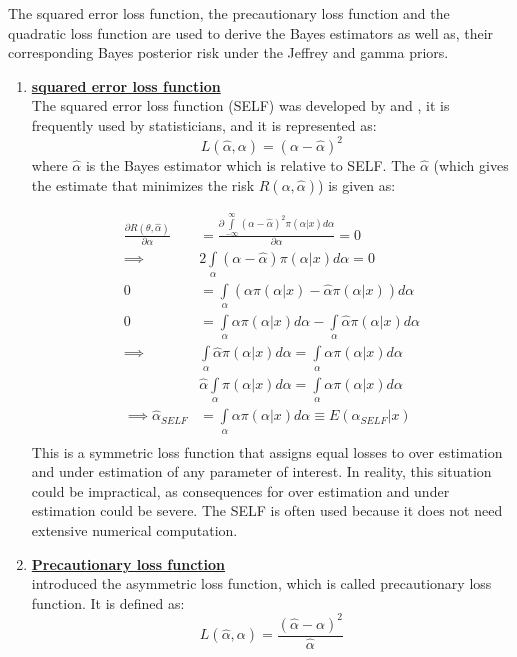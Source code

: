 \documentclass[a4paper,12pt]{report}
\newcommand{\para}{\hspace{0.5cm}}
\begin{document}
\noindent\para The squared error loss function, the precautionary loss function and the quadratic loss function are used to derive the Bayes estimators as well as, their corresponding Bayes posterior risk under the Jeffrey and gamma priors.

\begin{enumerate}
	\item \noindent\textbf{\underline{squared error loss function}}\\
	The squared error loss function (SELF) was developed by \cite{legendre1805} and \cite{gauss1810}, it is frequently used by statisticians, and it is represented as:
	\begin{equation}
	L(\hat{\alpha},\alpha)=(\alpha-\hat{\alpha})^2	
	\end{equation}
	where $\hat{\alpha}$ is the Bayes estimator which is relative to SELF. The $\hat{\alpha}$ (which gives the estimate that minimizes the risk $R(\alpha,\hat{\alpha})$) is given as:	
	
	
	\begin{equation}\label{3.32}
	\begin{split}
	\frac{\partial R(\theta,\hat{\alpha})}{\partial \alpha}&=\frac{\partial\int\limits_{-\infty}^{\infty}(\alpha-\hat{\alpha})^2\pi(\alpha|x)d\alpha}{\partial\alpha}=0\\
	\implies &2\int\limits_{\alpha}(\alpha-\hat{\alpha})\pi(\alpha|x)d\alpha=0\\
	0&=\int\limits_{\alpha}\left(\alpha\pi(\alpha|x)-\hat{\alpha}\pi(\alpha|x)\right)d\alpha\\
	0&=\int\limits_{\alpha} \alpha\pi(\alpha|x) d\alpha - \int\limits_{\alpha} \hat{\alpha}\pi(\alpha|x) d\alpha\\
	\implies &\int\limits_{\alpha} \hat{\alpha}\pi(\alpha|x) d\alpha=\int\limits_{\alpha} \alpha\pi(\alpha|x) d\alpha\\
	&\hat{\alpha}\int\limits_{\alpha} \pi(\alpha|x) d\alpha=\int\limits_{\alpha} \alpha\pi(\alpha|x) d\alpha\\
	\implies \hat{\alpha}_{SELF}&=\int\limits_{\alpha} \alpha\pi(\alpha|x) d\alpha\equiv E(\alpha_{SELF}|x)\\
	\end{split}	
	\end{equation}
	This is a symmetric loss function that assigns equal losses to over estimation and under estimation of any parameter of interest. In reality, this situation could be impractical, as consequences for over estimation and under estimation could be severe. The SELF is often used because it does not need extensive numerical computation.	
	\item \noindent\textbf{\underline{Precautionary loss function}}\\
	\cite{Norstrom1996} introduced the asymmetric loss function, which is called precautionary loss function. It is defined as:
	\begin{equation}
	L(\hat{\alpha},\alpha)=\frac{(\hat{\alpha}-\alpha)^2}{\hat{\alpha}}
	\end{equation}
	

\end{enumerate}
\end{document}
